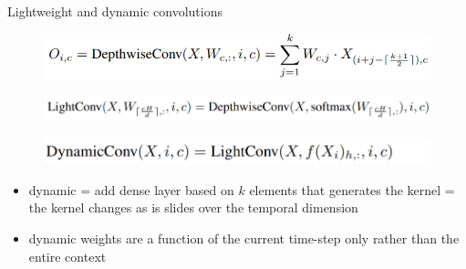 \documentclass{beamer}
\begin{document}
\begin{frame}{Lightweight and dynamic convolutions}

\begin{figure}[h]
\includegraphics[width=1.0\textwidth]{img/depthwise_math}
\end{figure}

\begin{figure}[h]
\includegraphics[width=1.0\textwidth]{img/light_math}
\end{figure}

\begin{figure}[h]
\includegraphics[width=1.0\textwidth]{img/dynamic_conv_math}
\end{figure}

\begin{itemize}
\item dynamic = add dense layer based on $k$ elements  that generates the kernel = the kernel changes as is slides over the temporal dimension
\item dynamic weights are a function of the current time-step only rather than the entire context
\end{itemize}

\end{frame}
\end{document}
